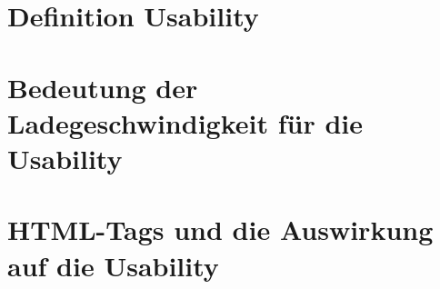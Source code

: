 
\section{Definition Usability}

\section{Bedeutung der Ladegeschwindigkeit für die Usability}
\label{sec:bedeutung_der_ladegeschwindigkeit_fur_die_usability}

\section{HTML-Tags und die Auswirkung auf die Usability}
\label{htmltags_und_die_auswirkung_auf_die_usability}
